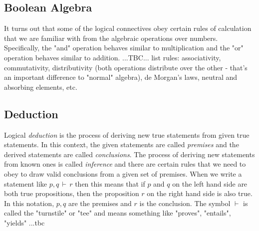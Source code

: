 \subsection{Boolean Algebra}
It turns out that some of the logical connectives obey certain rules of calculation that we are familiar with from the algebraic operations over numbers. Specifically, the "and" operation behaves similar to multiplication and the "or" operation behaves similar to addition. ...TBC... list rules: associativity, commutativity, distributivity (both operations distribute over the other - that's an important difference to "normal" algebra), de Morgan's laws, neutral and absorbing elements, etc.

%




\subsection{Deduction}
Logical \emph{deduction} is the process of deriving new true statements from given true statements. In this context, the given statements are called \emph{premises} and the derived statements are called \emph{conclusions}. The process of deriving new statements from known ones is called \emph{inference} and there are certain rules that we need to obey to draw valid conclusions from a given set of premises. When we write a statement like $p,q \,\vdash\, r$ then this means that if $p$ and $q$ on the left hand side are both true propositions, then the proposition $r$ on the right hand side is also true. In this notation, $p,q$ are the premises and $r$ is the conclusion. The symbol $\vdash$ is called the "turnstile" or "tee" and means something like "proves", "entails", "yields"  ...tbc




